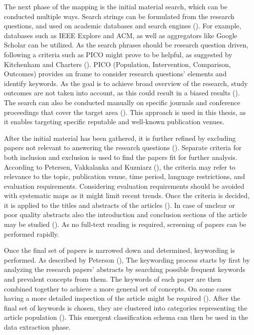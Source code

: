 \documentclass[utf8,english]{gradu3}
\begin{document}
The next phase of the mapping is the initial material search, which can be
conducted multiple ways. Search strings can be formulated from the research
questions, and used on academic databases and search engines
(\cite{petersen2008}). For example, databases such as IEEE Explore and ACM, as
well as aggregators like Google Scholar can be utilized. As the search phrases
should be research question driven, following a criteria such as PICO might
prove to be helpful, as suggested by Kitchenham and Charters
(\cite*{kitchenham2007}). PICO (Population, Intervention, Comparison, Outcomes)
provides an frame to consider research questions' elements and identify
keywords. As the goal is to achieve broad overview of the research, study
outcomes are not taken into account, as this could result in a biased results
(\cite{petersen2008}). The search can also be conducted manually on specific
journals and conference proceedings that cover the target area
(\cite{petersen2008}). This approach is used in this thesis, as it enables
targeting specific reputable and well-known publication venues.

After the initial material has been gathered, it is further refined by excluding
papers not relevant to answering the research questions (\cite{petersen2008}).
Separate criteria for both inclusion and exclusion is used to find the papers
fit for further analysis. According to Petersen, Vakkalanka and Kuzniarz
(\cite*{petersen2015}), the criteria may refer to relevance to the topic,
publication venue, time period, language restrictions, and evaluation
requirements. Considering evaluation requirements should be avoided with
systematic maps as it might limit recent trends. Once the criteria is decided,
it is applied to the titles and abstracts of the articles (\cite{petersen2015}).
In case of unclear or poor quality abstracts also the introduction and
conclusion sections of the article may be studied (\cite{petersen2008}). As no
full-text reading is required, screening of papers can be performed rapidly.

Once the final set of papers is narrowed down and determined, keywording is
performed. As described by Peterson (\cite*{petersen2008}), The keywording
process starts by first by analyzing the research papers' abstracts by searching
possible frequent keywords and prevalent concepts from them. The keywords of
each paper are then combined together to achieve a more general set of concepts.
On some cases having a more detailed inspection of the article might be required
(\cite{petersen2008,petersen2015}). After the final set of keywords is chosen,
they are clustered into categories representing the article population
(\cite{petersen2008}). This emergent classification schema can then be used in
the data extraction phase.
\end{document}
